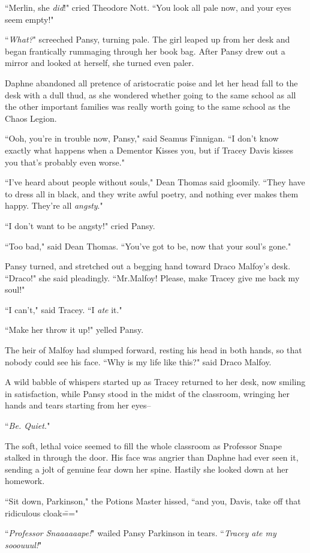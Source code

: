 ``Merlin, she \emph{did}!" cried Theodore Nott. ``You look all pale now, and your eyes seem empty!"

``\emph{What?}" screeched Pansy, turning pale. The girl leaped up from her desk and began frantically rummaging through her book bag. After Pansy drew out a mirror and looked at herself, she turned even paler.

Daphne abandoned all pretence of aristocratic poise and let her head fall to the desk with a dull thud, as she wondered whether going to the same school as all the other important families was really worth going to the same school as the Chaos Legion.

``Ooh, you're in trouble now, Pansy," said Seamus Finnigan. ``I don't know exactly what happens when a Dementor Kisses you, but if Tracey Davis kisses you that's probably even worse."

``I've heard about people without souls," Dean Thomas said gloomily. ``They have to dress all in black, and they write awful poetry, and nothing ever makes them happy. They're all \emph{angsty}."

``I don't want to be angsty!" cried Pansy.

``Too bad," said Dean Thomas. ``You've got to be, now that your soul's gone."

Pansy turned, and stretched out a begging hand toward Draco Malfoy's desk. ``Draco!" she said pleadingly. ``Mr.\?Malfoy! Please, make Tracey give me back my soul!"

``I can't," said Tracey. ``I \emph{ate} it."

``Make her throw it up!" yelled Pansy.

The heir of Malfoy had slumped forward, resting his head in both hands, so that nobody could see his face. ``Why is my life like this?" said Draco Malfoy.

A wild babble of whispers started up as Tracey returned to her desk, now smiling in satisfaction, while Pansy stood in the midst of the classroom, wringing her hands and tears starting from her eyes\---

``\emph{Be. Quiet.}"

The soft, lethal voice seemed to fill the whole classroom as Professor Snape stalked in through the door. His face was angrier than Daphne had ever seen it, sending a jolt of genuine fear down her spine. Hastily she looked down at her homework.

``Sit down, Parkinson," the Potions Master hissed, ``and you, Davis, take off that ridiculous cloak\==="

``\emph{Professor Snaaaaaape!}" wailed Pansy Parkinson in tears. ``\emph{Tracey ate my sooouuul!}"

